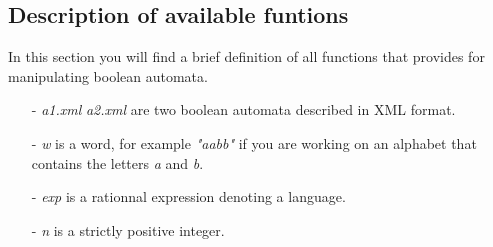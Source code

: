 \subsection{Description of available funtions}
In this section you will find a brief definition of all functions that
\Vauc provides for manipulating boolean automata.\\
\begin{itemize}
\item[-] \textit{a1.xml} \textit{a2.xml} are two boolean automata described in
  \Vauc XML format.
\item[-] \textit{w} is a word, for example \textit{"aabb"} if you are working on an
  alphabet that contains the letters \textit{a} and \textit{b}.
\item[-] \textit{exp} is a rationnal expression denoting a language.
\item[-] \textit{n} is a strictly positive integer.
\end{itemize}

